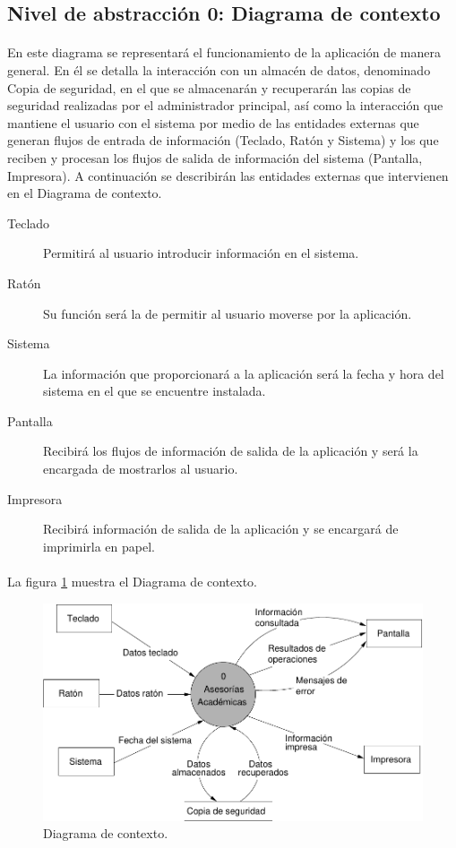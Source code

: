 \subsection{Nivel de abstracción 0: Diagrama de contexto}

  \paragraph{}En este diagrama se representará el funcionamiento de la
  aplicación de manera general. En él se detalla la interacción con un almacén
  de datos, denominado Copia de seguridad, en el que se almacenarán y
  recuperarán las copias de seguridad realizadas por el administrador principal,
  así como la interacción que mantiene el usuario con el sistema por medio de
  las entidades externas que generan flujos de entrada de información (Teclado,
  Ratón y Sistema) y los que reciben y procesan los flujos de salida de
  información del sistema (Pantalla, Impresora). A continuación se describirán
  las entidades externas que intervienen en el Diagrama de contexto.

  \begin{description}
   \item[Teclado] Permitirá al usuario introducir información en el sistema.

   \item[Ratón] Su función será la de permitir al usuario moverse por la
                aplicación.
   \item[Sistema] La información que proporcionará a la aplicación será la fecha
                  y hora del sistema en el que se encuentre instalada.
   \item[Pantalla] Recibirá los flujos de información de salida de la aplicación
                   y será la encargada de mostrarlos al usuario.
   \item[Impresora] Recibirá información de salida de la aplicación y se
                    encargará de imprimirla en papel.
  \end{description}

  \paragraph{}La figura \ref{diagramaContexto} muestra el Diagrama de contexto.

        \begin{figure}[!ht]
            \begin{center}
            \includegraphics[]{08.Analisis_Funcional/8.2.DFDs/Niveles/Diagramas/diagrama_contexto.pdf}
            \caption{Diagrama de contexto.}
            \label{diagramaContexto}
            \end{center}
         \end{figure}
